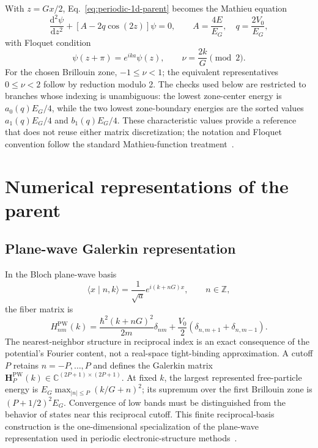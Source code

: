 With $z=Gx/2$, Eq.~\eqref{eq:periodic-1d-parent} becomes the Mathieu equation
\begin{equation}
    \frac{\mathrm{d}^2\psi}{\mathrm{d}z^2}
    +\left[A-2q\cos(2z)\right]\psi=0,
    \qquad
    A=\frac{4E}{E_G},
    \quad
    q=\frac{2V_0}{E_G},
    \label{eq:periodic-1d-mathieu}
\end{equation}
with Floquet condition
\begin{equation}
    \psi(z+\pi)=e^{ika}\psi(z),
    \qquad
    \nu=\frac{2k}{G}\pmod 2.
\end{equation}
For the chosen Brillouin zone, $-1\leq\nu<1$; the equivalent representatives
$0\leq\nu<2$ follow by reduction modulo 2. The checks used below are restricted
to branches whose indexing is unambiguous: the lowest zone-center energy is
$a_0(q)E_G/4$, while the two lowest zone-boundary energies are the sorted values
$a_1(q)E_G/4$ and $b_1(q)E_G/4$. These characteristic values provide a
reference that does not reuse either matrix discretization; the notation and
Floquet convention follow the standard Mathieu-function
treatment~\cite{mclachlan1947}.

\section{Numerical representations of the parent}

\subsection{Plane-wave Galerkin representation}

In the Bloch plane-wave basis
\begin{equation}
    \langle x\mid n,k\rangle
    =
    \frac{1}{\sqrt a}e^{i(k+nG)x},
    \qquad n\in\mathbb Z,
\end{equation}
the fiber matrix is
\begin{equation}
    H^{\mathrm{PW}}_{nm}(k)
    =
    \frac{\hbar^2(k+nG)^2}{2m}\delta_{nm}
    +\frac{V_0}{2}
    \left(\delta_{n,m+1}+\delta_{n,m-1}\right).
    \label{eq:periodic-1d-pw-matrix}
\end{equation}
The nearest-neighbor structure in reciprocal index is an exact consequence of
the potential's Fourier content, not a real-space tight-binding approximation.
A cutoff $P$ retains $n=-P,\ldots,P$ and defines the Galerkin matrix
$\mathbf H_P^{\mathrm{PW}}(k)\in\mathbb C^{(2P+1)\times(2P+1)}$.
At fixed $k$, the largest represented free-particle energy is
$E_G\max_{|n|\leq P}(k/G+n)^2$; its supremum over the first Brillouin zone is
$(P+1/2)^2E_G$. Convergence of low bands must be distinguished from the behavior
of states near this reciprocal cutoff. This finite reciprocal-basis construction is
the one-dimensional specialization of the plane-wave representation used in
periodic electronic-structure methods~\cite{payne1992}.

